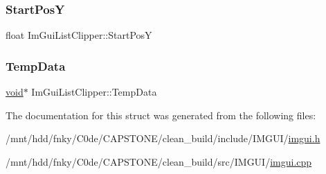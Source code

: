 \mbox{\label{structImGuiListClipper_affee91b338520cd4bd59b5b680dcb5ae}} 
\subsubsection{\texorpdfstring{Start\+PosY}{StartPosY}}
{\footnotesize\ttfamily float Im\+Gui\+List\+Clipper\+::\+Start\+PosY}

\mbox{\label{structImGuiListClipper_a596215ed18fa6d4094d9bf4da975e1be}} 
\subsubsection{\texorpdfstring{Temp\+Data}{TempData}}
{\footnotesize\ttfamily \hyperlink{imgui__impl__opengl3__loader_8h_ac668e7cffd9e2e9cfee428b9b2f34fa7}{void}$\ast$ Im\+Gui\+List\+Clipper\+::\+Temp\+Data}



The documentation for this struct was generated from the following files\+:\begin{DoxyCompactItemize}
\item 
/mnt/hdd/fnky/\+C0de/\+C\+A\+P\+S\+T\+O\+N\+E/clean\+\_\+build/include/\+I\+M\+G\+U\+I/\hyperlink{imgui_8h}{imgui.\+h}\item 
/mnt/hdd/fnky/\+C0de/\+C\+A\+P\+S\+T\+O\+N\+E/clean\+\_\+build/src/\+I\+M\+G\+U\+I/\hyperlink{imgui_8cpp}{imgui.\+cpp}\end{DoxyCompactItemize}
